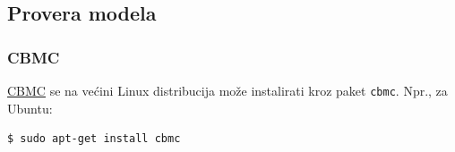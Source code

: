 \subsection{Provera modela}\label{instalacija-cbmc-provera-modela}

\subsubsection{CBMC}\label{instalacija-cbmc}

\href{https://www.cprover.org/cbmc/}{CBMC} se na većini Linux distribucija može instalirati kroz paket \texttt{cbmc}. Npr., za Ubuntu:

\begin{verbatim}
$ sudo apt-get install cbmc
\end{verbatim}
